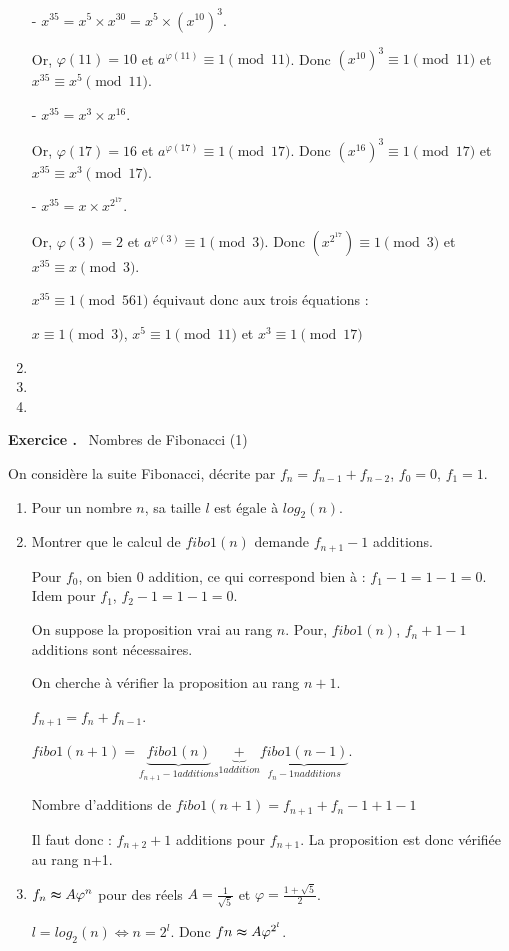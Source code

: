 \documentclass[a4paper,10pt]{article}
\newcounter{exercice}
\newcommand{\exercice}{%
		\refstepcounter{exercice}%
		\bigskip
		\bigskip
		\noindent\textbf{Exercice \theexercice.}~%
	}
\begin{document}
\begin{enumerate}
	- $x^{35}=x^5 \times x^{30}=x^5 \times (x^{10})^3$.
	
	Or, $\varphi(11)=10$ et $a^{\varphi(11)}\equiv 1 \pmod{11}$.
	Donc $(x^{10})^3\equiv 1\pmod{11}$ et $x^{35}\equiv x^5 \pmod{11}$.
	
	- $x^{35}=x^3 \times x^{16}$.
	
	Or, $\varphi(17)=16$ et $a^{\varphi(17)}\equiv 1 \pmod{17}$.
	Donc $(x^{16})^3\equiv 1\pmod{17}$ et $x^{35}\equiv x^3 \pmod{17}$.
	
	- $x^{35}=x \times x^{2^{17}}$.
	
	Or, $\varphi(3)=2$ et $a^{\varphi(3)}\equiv 1 \pmod{3}$.
	Donc $(x^{2^{17}})\equiv 1\pmod{3}$ et $x^{35}\equiv x \pmod{3}$.
	\medskip
	
	$x^{35} \equiv 1 \pmod{561}$ équivaut donc aux trois équations :
	\begin{center}
	$x \equiv 1\pmod{3}$, $  x^5\equiv 1 \pmod{11}$ et $x^3\equiv 1 \pmod{17}$
		\end{center}
	\item
	\item
	\item
	\end{enumerate}
	\exercice Nombres de Fibonacci (1)

On considère la suite Fibonacci, décrite par $f_n=f_{n-1}+f_{n-2}$, $f_0=0$, $f_1=1$.

	\begin{enumerate}
	\item
		Pour un nombre $n$, sa taille $l$ est égale à $log_2(n)$.
	\item
	Montrer que le calcul de $fibo1(n)$ demande $f_{n+1}-1 $ additions.
	
	Pour $f_0$, on bien $0$ addition, ce qui correspond bien à : $f_1-1=1-1=0$.
	Idem pour $f_1$, $f_2-1=1-1=0$.
	
	On suppose la proposition vrai au rang $n$. Pour, $fibo1(n)$, $f_n+1-1 $ additions sont nécessaires.
	
	On cherche à vérifier la proposition au rang $n+1$.
	
	$f_{n+1}=f_n+f_{n-1}$.
	
	$fibo1(n+1)=\underbrace{fibo1(n)}_{f_{n+1}-1 additions}\underbrace{+}_{1 addition}\underbrace{fibo1(n-1)}_{f_n-1n additions}$.
	
	Nombre d'additions de $fibo1(n+1)= f_{n+1}+f_n-1 +1- 1$
	
	
	Il faut donc : $f_{n+2}+1$ additions pour $f_{n+1}$. La proposition est donc vérifiée au rang n+1.
	
	
	\item
	$f_n\thickapprox A\varphi^n$ pour des réels $A=\frac{1}{\sqrt{5}}$ et $\varphi=\frac{1+\sqrt{5}}{2}$.
	
	$l=log_2(n)\Leftrightarrow n=2^l$.
	Donc $fn\thickapprox A\varphi^{2^l}$.
	
	\end{enumerate}
\end{document}

